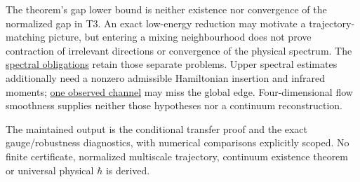 \documentclass[11pt,a4paper]{article}
\begin{document}
The theorem's gap lower bound is neither existence nor convergence of
the normalized gap in T3. An exact low-energy reduction may motivate a
trajectory-matching picture, but entering a mixing neighbourhood does
not prove contraction of irrelevant directions or convergence of the
physical spectrum. The \href{mass-gap-obligations-lattice.md}{spectral
obligations} retain those separate problems. Upper spectral estimates
additionally need a nonzero admissible Hamiltonian insertion and
infrared moments; \href{finiteness-half-flowed-susceptibility.md}{one
observed channel} may miss the global edge. Four-dimensional flow
smoothness supplies neither those hypotheses nor a continuum
reconstruction.

The maintained output is the conditional transfer proof and the exact
gauge/robustness diagnostics, with numerical comparisons explicitly
scoped. No finite certificate, normalized multiscale trajectory,
continuum existence theorem or universal physical \(\hbar\) is derived.
\end{document}
